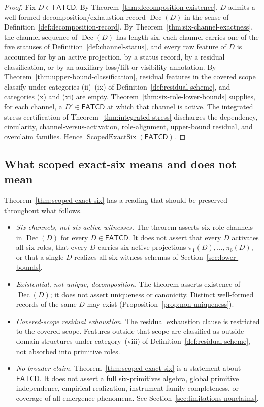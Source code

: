 \documentclass[11pt]{article}
\theoremstyle{definition}
\newcommand{\FATCD}{\ensuremath{\mathsf{FATCD}}}
\newcommand{\Dec}[1]{\ensuremath{\operatorname{Dec}\!\left(#1\right)}}
\newcommand{\ScopedExactSix}[1]{\ensuremath{\operatorname{ScopedExactSix}\!\left(#1\right)}}
\begin{document}
\begin{proof}
Fix \(D \in \FATCD{}\). By Theorem~\ref{thm:decomposition-existence},
\(D\) admits a well-formed decomposition/exhaustion record \(\Dec{D}\)
in the sense of Definition~\ref{def:decomposition-record}. By
Theorem~\ref{thm:six-channel-exactness}, the channel sequence of
\(\Dec{D}\) has length six, each channel carries one of the five
statuses of Definition~\ref{def:channel-status}, and every raw
feature of \(D\) is accounted for by an active projection, by a
status record, by a residual classification, or by an auxiliary
loss/lift or visibility annotation. By
Theorem~\ref{thm:upper-bound-classification}, residual features in
the covered scope classify under categories (ii)--(ix) of
Definition~\ref{def:residual-scheme}, and categories (x) and (xi) are
empty. Theorem~\ref{thm:six-role-lower-bounds} supplies, for each
channel, a \(D' \in \FATCD{}\) at which that channel is active. The
integrated stress certification of
Theorem~\ref{thm:integrated-stress} discharges the dependency,
circularity, channel-versus-activation, role-alignment, upper-bound
residual, and overclaim families. Hence \(\ScopedExactSix{\FATCD{}}\).
\end{proof}

\subsection{What scoped exact-six means and does not mean}\label{subsec:exact-six-meaning}

Theorem~\ref{thm:scoped-exact-six} has a reading that should be
preserved throughout what follows.

\begin{itemize}[topsep=2pt,itemsep=1pt]
  \item \emph{Six channels, not six active witnesses.} The theorem
    asserts six role channels in \(\Dec{D}\) for every
    \(D \in \FATCD{}\). It does not assert that every \(D\) activates
    all six roles, that every \(D\) carries six active projections
    \(\pi_1(D), \ldots, \pi_6(D)\), or that a single \(D\) realizes
    all six witness schemas of Section~\ref{sec:lower-bounds}.
  \item \emph{Existential, not unique, decomposition.} The theorem
    asserts existence of \(\Dec{D}\); it does not assert uniqueness or
    canonicity. Distinct well-formed records of the same \(D\) may
    exist (Proposition~\ref{prop:non-uniqueness}).
  \item \emph{Covered-scope residual exhaustion.} The residual
    exhaustion clause is restricted to the covered scope. Features
    outside that scope are classified as outside-domain structures
    under category~(viii) of Definition~\ref{def:residual-scheme},
    not absorbed into primitive roles.
  \item \emph{No broader claim.} Theorem~\ref{thm:scoped-exact-six}
    is a statement about \FATCD{}. It does not assert a full
    six-primitives algebra, global primitive independence, empirical
    realization, instrument-family completeness, or coverage of all
    emergence phenomena. See Section~\ref{sec:limitations-nonclaims}.
\end{itemize}
\end{document}
